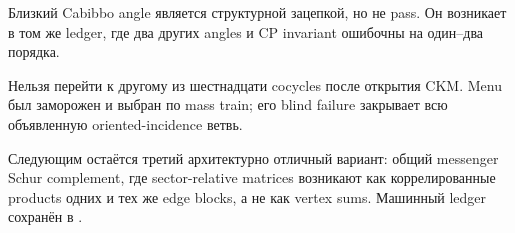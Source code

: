 \begin{remark}
Близкий Cabibbo angle является структурной зацепкой, но не pass. Он возникает
в том же ledger, где два других angles и CP invariant ошибочны на один--два
порядка.
\end{remark}

\begin{nogocriterion}
Нельзя перейти к другому из шестнадцати cocycles после открытия CKM. Menu был
заморожен и выбран по mass train; его blind failure закрывает всю объявленную
oriented-incidence ветвь.
\end{nogocriterion}

Следующим остаётся третий архитектурно отличный вариант: общий messenger
Schur complement, где sector-relative matrices возникают как коррелированные
products одних и тех же edge blocks, а не как vertex sums. Машинный ledger
сохранён в .